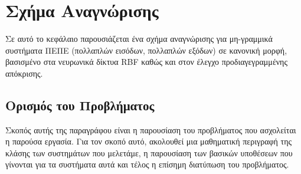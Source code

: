 \chapter{Σχήμα Αναγνώρισης}
Σε αυτό το κεφάλαιο παρουσιάζεται ένα σχήμα αναγνώρισης για μη-γραμμικά συστήματα ΠΕΠΕ (πολλαπλών εισόδων, πολλαπλών εξόδων) σε κανονική μορφή, βασισμένο στα νευρωνικά δίκτυα RBF καθώς και στον έλεγχο προδιαγεγραμμένης απόκρισης.


\section{Ορισμός του Προβλήματος}
Σκοπός αυτής της παραγράφου είναι η παρουσίαση του προβλήματος που ασχολείται η παρούσα εργασία. Για τον σκοπό αυτό, ακολουθεί μια μαθηματική περιγραφή της κλάσης των συστημάτων που μελετάμε, η παρουσίαση των βασικών υποθέσεων που γίνονται για τα συστήματα αυτά και τέλος η επίσημη διατύπωση του προβλήματος.
